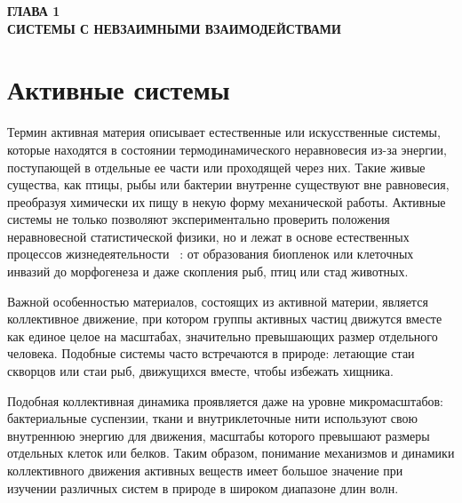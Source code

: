 
\newpage
\begin{center}
\textbf{ГЛАВА 1}\\
\textbf{СИСТЕМЫ С НЕВЗАИМНЫМИ ВЗАИМОДЕЙСТВАМИ}
\end{center}




\section{Активные системы}\label{C1}




Термин активная материя описывает естественные или искусственные системы, которые находятся в состоянии термодинамического 
неравновесия из-за энергии, поступающей в отдельные ее части или проходящей через них. Такие живые существа, как
птицы, рыбы или бактерии внутренне существуют вне равновесия, преобразуя химически их пищу в некую форму механической работы.
Активные системы не только позволяют экспериментально проверить положения неравновесной статистической физики, но
и лежат в основе естественных процессов жизнедеятельности ~\cite{Needleman2017}: от образования биопленок
или клеточных инвазий до морфогенеза и даже скопления рыб, птиц или стад животных.


Важной особенностью материалов, состоящих из активной материи, является коллективное
движение, при котором группы активных частиц движутся вместе как единое целое на масштабах, значительно превышающих размер отдельного человека. 
Подобные системы часто встречаются в природе: летающие стаи скворцов или стаи рыб, движущихся вместе, чтобы избежать хищника.

Подобная коллективная динамика проявляется даже на уровне микромасштабов: бактериальные суспензии, ткани и
внутриклеточные нити используют свою внутреннюю энергию для движения, масштабы которого превышают размеры отдельных клеток или белков. Таким образом, понимание
механизмов и динамики коллективного движения активных веществ имеет большое значение при изучении различных систем в природе в широком диапазоне длин волн.


